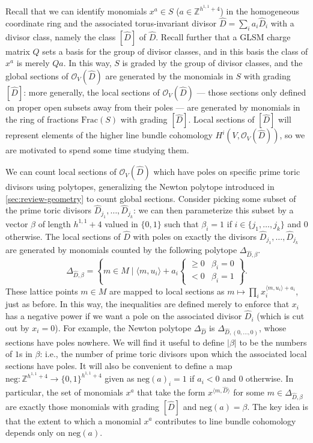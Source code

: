 \documentclass[11pt,dvipsnames]{article}
\theoremstyle{definition}
\begin{document}
Recall that we can identify monomials $x^a \in S$ ($a \in \mathbb{Z}^{h^{1,1}+4}$) in the homogeneous coordinate ring and the associated torus-invariant divisor $\hat{D} = \sum_i a_i \hat{D}_i$ with a divisor class, namely the class $[\hat{D}]$ of $\hat{D}$. Recall further that a GLSM charge matrix $Q$ sets a basis for the group of divisor classes, and in this basis the class of $x^a$ is merely $Qa$. In this way, $S$ is graded by the group of divisor classes, and the global sections of $\mathcal{O}_V(\hat{D})$ are generated by the monomials in $S$ with grading $[\hat{D}]$: more generally, the local sections of $\mathcal{O}_V(\hat{D})$ --- those sections only defined on proper open subsets away from their poles --- are generated by monomials in the ring of fractions $\mathrm{Frac}(S)$ with grading $[\hat{D}]$. Local sections of $[\hat{D}]$ will represent elements of the higher line bundle cohomology $H^i(V, \mathcal{O}_V(\hat{D}))$, so we are motivated to spend some time studying them.

We can count local sections of $\mathcal{O}_V(\hat{D})$ which have poles on specific prime toric divisors using polytopes, generalizing the Newton polytope introduced in \cref{sec:review-geometry} to count global sections. Consider picking some subset of the prime toric divisors $\hat{D}_{j_1}, \dots, \hat{D}_{j_k}$: we can then parameterize this subset by a vector $\beta$ of length $h^{1,1} + 4$ valued in $\{0, 1\}$ such that $\beta_i = 1$ if $i \in \{j_1, \dots, j_k\}$ and $0$ otherwise. The local sections of $\hat{D}$ with poles on exactly the divisors $\hat{D}_{j_1}, \dots, \hat{D}_{j_k}$ are generated by monomials counted by the following polytope $\Delta_{\hat{D},\beta}$.
\begin{equation}
\label{eq:Hi Mlattice}
    \Delta_{\hat{D}, \beta} = \left\{ m \in M \; \Bigg| \; \langle m, u_i \rangle + a_i 
    \begin{cases} \geq 0 & \beta_i = 0 \\ < 0 & \beta_i = 1 \end{cases} \right\}.
\end{equation}
These lattice points $m \in M$ are mapped to local sections as $m \mapsto \prod_i x_i^{\langle m, u_i \rangle + a_i}$, just as before. In this way, the inequalities are defined merely to enforce that $x_i$ has a negative power if we want a pole on the associated divisor $\hat{D}_i$ (which is cut out by $x_i = 0$). For example, the Newton polytope $\Delta_{\hat{D}}$ is $\Delta_{\hat{D},(0, \dots, 0)}$, whose sections have poles nowhere. We will find it useful to define $|\beta|$ to be the numbers of $1$s in $\beta$: i.e., the number of prime toric divisors upon which the associated local sections have poles. It will also be convenient to define a map $\mathrm{neg} : \mathbb{Z}^{h^{1,1} + 4} \to \{0,1\}^{h^{1,1} + 4}$ given as $\mathrm{neg}(a)_i = 1$ if $a_i < 0$ and $0$ otherwise. In particular, the set of monomials $x^a$ that take the form $x^{\langle m, \hat{D} \rangle}$ for some $m \in \Delta_{\hat{D}, \beta}$ are exactly those monomials with grading $[\hat{D}]$ and $\mathrm{neg}(a) = \beta$. The key idea is that the extent to which a monomial $x^a$ contributes to line bundle cohomology depends only on $\mathrm{neg}(a)$. 
\end{document}
